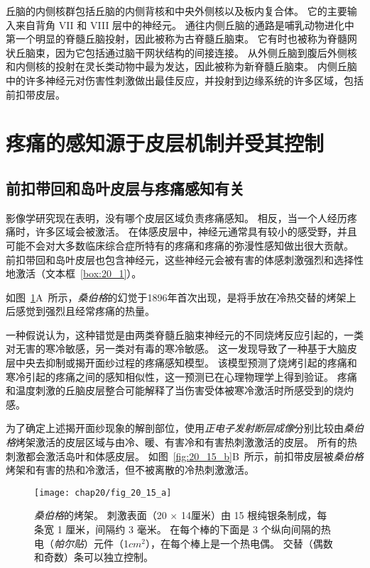 丘脑的内侧核群包括丘脑的内侧背核和中央外侧核以及板内复合体。
它的主要输入来自背角 VII 和 VIII 层中的神经元。 
通往内侧丘脑的通路是哺乳动物进化中第一个明显的脊髓丘脑投射，因此被称为古脊髓丘脑束。
它有时也被称为脊髓网状丘脑束，因为它包括通过脑干网状结构的间接连接。
从外侧丘脑到腹后外侧核和内侧核的投射在灵长类动物中最为发达，因此被称为新脊髓丘脑束。
内侧丘脑中的许多神经元对伤害性刺激做出最佳反应，并投射到边缘系统的许多区域，包括前扣带皮层。



\section{疼痛的感知源于皮层机制并受其控制}

\subsection{前扣带回和岛叶皮层与疼痛感知有关}

影像学研究现在表明，没有哪个皮层区域负责疼痛感知。 
相反，当一个人经历疼痛时，许多区域会被激活。
在体感皮层中，神经元通常具有较小的感受野，并且可能不会对大多数临床综合症所特有的疼痛和疼痛的弥漫性感知做出很大贡献。
前扣带回和岛叶皮层也包含神经元，这些神经元会被有害的体感刺激强烈和选择性地激活（文本框~\ref{box:20_1}）。


\begin{proposition}[大脑皮层幻觉疼痛的定位] \label{box:20_1}
	
	\quad \quad 如图~\ref{fig:20_15_a}A~所示，\textit{桑伯格}的幻觉于1896年首次出现，是将手放在冷热交替的烤架上后感觉到强烈且经常疼痛的热量。
	
	\quad \quad 一种假说认为，这种错觉是由两类脊髓丘脑束神经元的不同烧烤反应引起的，一类对无害的寒冷敏感，另一类对有毒的寒冷敏感。
	这一发现导致了一种基于大脑皮层中央去抑制或揭开面纱过程的疼痛感知模型。
	该模型预测了烧烤引起的疼痛和寒冷引起的疼痛之间的感知相似性，这一预测已在心理物理学上得到验证。
	疼痛和温度刺激的丘脑皮层整合可能解释了当伤害受体被寒冷激活时所感受到的烧灼感。
	
	\quad \quad 为了确定上述揭开面纱现象的解剖部位，使用\textit{正电子发射断层成像}分别比较由\textit{桑伯格}烤架激活的皮层区域与由冷、暖、有害冷和有害热刺激激活的皮层。
	所有的热刺激都会激活岛叶和体感皮层。
	如图~\ref{fig:20_15_b}B~所示，前扣带皮层被\textit{桑伯格}烤架和有害的热和冷激活，但不被离散的冷热刺激激活。
	
\end{proposition}


\begin{figure}[htbp]
	\centering
	\texttt{[image: chap20/fig\_20\_15\_a]}
	\caption{\textit{桑伯格}的烤架。
		刺激表面（20 $\times$ 14厘米）由 15 根纯银条制成，每条宽 1 厘米，间隔约 3 毫米。
		在每个棒的下面是 3 个纵向间隔的热电（\textit{帕尔贴}）元件（1$ cm^2 $），在每个棒上是一个热电偶。
		交替（偶数和奇数）条可以独立控制\cite{craig1994thermal}。}
	\label{fig:20_15_a}
\end{figure}



